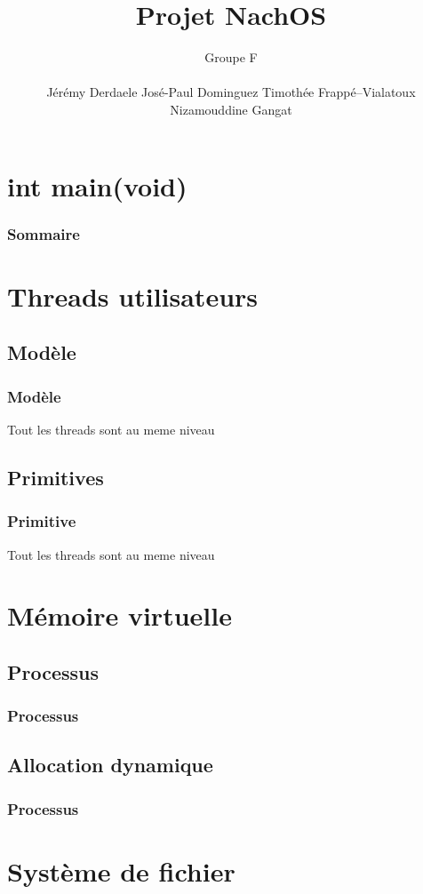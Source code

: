 \documentclass{beamer}
\title{Projet NachOS}
\author{
  Groupe F \newline{}
  {\rule{5cm}{0.4pt}}\newline{}
  Jérémy Derdaele\newline{}
  José-Paul Dominguez\newline{}
  Timothée Frappé--Vialatoux\newline{}
  Nizamouddine Gangat\newline{}
  {\rule{5cm}{0.4pt}}\newline{}
}
\begin{document}
\begin{frame}
  \titlepage
\end{frame}

\section*{int main(void)}
\begin{frame}
  \frametitle{Sommaire}
  \tableofcontents
\end{frame}

\section{Threads utilisateurs}
\subsection{Modèle}
\begin{frame}
  \frametitle{Modèle}
  Tout les threads sont au meme niveau
\end{frame}

\subsection{Primitives}
\begin{frame}
  \frametitle{Primitive}
  Tout les threads sont au meme niveau
\end{frame}

\section{Mémoire virtuelle}
\subsection{Processus}
\begin{frame}
  \frametitle{Processus}
\end{frame}

\subsection{Allocation dynamique}
\begin{frame}
  \frametitle{Processus}
\end{frame}

\section{Système de fichier}
\end{document}
